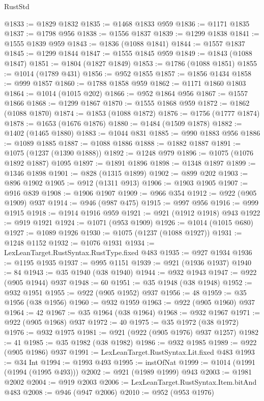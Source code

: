 \begin{lexlean}{RustStd}
\begin{coremodule}
@1833 := @1829 @1832
@1835 := @1468 @1833 @959
@1836 := @1171 @1835
@1837 := @1798 @956
@1838 := @1556 @1837
@1839 := @1299 @1838
@1841 := @1555 @1839 @959
@1843 := @1836 (@1088 @1841)
@1844 := @1557 @1837
@1845 := @1299 @1844
@1847 := @1555 @1845 @959
@1849 := @1843 (@1088 @1847)
@1851 := @1804 (@1827 @1849)
@1853 := @1786 (@1088 @1851)
@1855 := @1014 (@1789 @431)
@1856 := @952 @1855
@1857 := @1856 @1434
@1858 := @999 @1857
@1860 := @1788 @1858 @959
@1862 := @1171 @1860 @1803
@1864 := @1014 (@1015 @202)
@1866 := @952 @1864 @956
@1867 := @1557 @1866
@1868 := @1299 @1867
@1870 := @1555 @1868 @959
@1872 := @1862 (@1088 @1870)
@1874 := @1853 (@1088 @1872)
@1876 := @1756 (@1777 @1874)
@1878 := @1653 (@1676 @1876)
@1880 := @1484 (@1509 @1878)
@1882 := @1402 (@1465 @1880)
@1883 := @1044 @831
@1885 := @990 @1883 @956
@1886 := @1089 @1885
@1887 := @1088 @1886
@1888 := @1882 @1887
@1891 := @1075 (@1237 (@1390 @1888))
@1892 := @1248 @979
@1896 := @1075 (@1076 @1892 @1887) @1095
@1897 := @1891 @1896
@1898 := @1348 @1897
@1899 := @1346 @1898
@1901 := @828 (@1315 @1899)
@1902 := @899 @202
@1903 := @896 @1902
@1905 := @912 (@1311 @913)
@1906 := @1903 @1905
@1907 := @916 @839
@1908 := @1906 @1907
@1909 := @966 @354
@1912 := @922 (@905 @1909) @937
@1914 := @946 (@987 @475)
@1915 := @997 @956
@1916 := @999 @1915
@1918 := @1914 @1916 @959
@1921 := @921 (@1912 @1918) @943
@1922 := @919 @1921
@1924 := @1071 (@953 @1909)
@1926 := @1014 (@1015 @680)
@1927 := @1089 @1926
@1930 := @1075 (@1237 (@1088 @1927))
@1931 := @1248 @1152
@1932 := @1076 @1931
@1934 := LexLeanTarget.RustSyntax.RustType.fixed @483
@1935 := @927 @1934
@1936 := @1195 @1935
@1937 := @995 @1151
@1939 := @921 (@1936 @1937)
@1940 := 84
@1943 := @35 @1940 (@38 @1940)
@1944 := @932 @1943
@1947 := @922 (@905 @1944) @937
@1948 := 60
@1951 := @35 @1948 (@38 @1948)
@1952 := @932 @1951
@1955 := @922 (@905 @1952) @937
@1956 := 48
@1959 := @35 @1956 (@38 @1956)
@1960 := @932 @1959
@1963 := @922 (@905 @1960) @937
@1964 := 42
@1967 := @35 @1964 (@38 @1964)
@1968 := @932 @1967
@1971 := @922 (@905 @1968) @937
@1972 := 40
@1975 := @35 @1972 (@38 @1972)
@1976 := @932 @1975
@1981 := @921 (@922 (@905 @1976) @937 @1257)
@1982 := 41
@1985 := @35 @1982 (@38 @1982)
@1986 := @932 @1985
@1989 := @922 (@905 @1986) @937
@1991 := LexLeanTarget.RustSyntax.Lit.fixed @483
@1993 := @34 Int
@1994 := @1993 @493
@1995 := instOfNat
@1999 := @1014 (@1991 (@1994 (@1995 @493)))
@2002 := @921 (@1989 @1999) @943
@2003 := @1981 @2002
@2004 := @919 @2003
@2006 := LexLeanTarget.RustSyntax.Item.bitAnd @483
@2008 := @946 (@947 @2006)
@2010 := @952 (@953 @1976)

\end{coremodule}
\end{lexlean}
